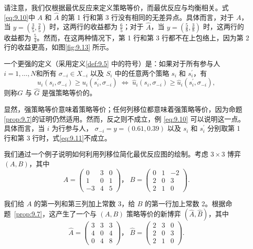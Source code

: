 请注意，我们仅根据最优反应来定义策略等价，而最优反应与均衡相关。式\eqref{eq:9.10}中 \(A\) 和 \(\widehat{A}\) 的第 1 行和第 3 行没有相同的无差异点。具体而言，对于 \(A\)，当 \(y = \left( {\frac{3}{5},\frac{2}{5}}\right)\) 时，这两行的收益都为 \(\frac{6}{5}\)；对于 \(\widehat{A}\)，当 \(y = \left( {\frac{5}{8},\frac{3}{8}}\right)\) 时，这两行的收益都为 \(\frac{5}{4}\)。然而，在这两种情况下，第 1 行和第 3 行都不在上包络上，因为第 2 行的收益更高，如图\ref{fig:9.13} 所示。


一个更强的定义（采用定义\ref{def:9.5} 中的符号）是：如果对于所有参与人 \(i = 1,\ldots,N\)和所有 \({\sigma }_{-i} \in  {X}_{-i}\) 以及 \({S}_{i}\) 中的任意两个策略 \({s}_{i}\) 和 \({s}_{i}^{\prime }\)，有
\begin{equation}  \label{eq:9.11}
{u}_{i}\left( {{s}_{i},{\sigma }_{-i}}\right)  \geq  {u}_{i}\left( {{s}_{i}^{\prime },{\sigma }_{-i}}\right) \; \Leftrightarrow  \;{\widehat{u}}_{i}\left( {{s}_{i},{\sigma }_{-i}}\right)  \geq  {\widehat{u}}_{i}\left( {{s}_{i}^{\prime },{\sigma }_{-i}}\right),
\end{equation} 
则称$G$ 与 $\widehat{G}$ 是强策略等价的。

显然，强策略等价意味着策略等价；任何列移位都意味着强策略等价，因为{\color{red}命题\ref{prop:9.7}}的证明仍然适用。然而，反之则不成立，例 \eqref{eq:9.10} 可以说明这一点。具体而言，当 \(i\) 为行参与人， \({\sigma }_{-i} = y = \left( {{0.61},{0.39}}\right)\) 以及 \({s}_{i}\) 和 \({s}_{i}^{\prime }\) 分别取第 1 行和第 3 行时，式\eqref{eq:9.11}不成立。


我们通过一个例子说明如何利用列移位简化最优反应图的绘制。考虑 \(3 \times  3\) 博弈 $(A, B)$，其中
\begin{equation}  \label{eq:9.12}
A = \left( \begin{array}{rrr} 0 & 3 & 0 \\  1 & 0 & 1 \\   - 3 & 4 & 5 \end{array}\right)，\;B = \left( \begin{array}{rrr} 0 & 1 &  - 2 \\  2 & 0 & 3 \\  2 & 1 & 0 \end{array}\right).
\end{equation} 


我们给 \(A\) 的第一列和第三列加上常数 3，给 \(B\) 的第一行加上常数 2。根据命题~\ref{prop:9.7}，这产生了一个与 $(A, B)$ 策略等价的新博弈 \(( {\widehat{A},\widehat{B}})\)，其中
\begin{equation}  \label{eq:9.13}
\widehat{A} = \left( \begin{array}{lll} 3 & 3 & 3 \\  4 & 0 & 4 \\  0 & 4 & 8 \end{array}\right)，\;\widehat{B} = \left( \begin{array}{lll} 2 & 3 & 0 \\  2 & 0 & 3 \\  2 & 1 & 0 \end{array}\right).
\end{equation} 

